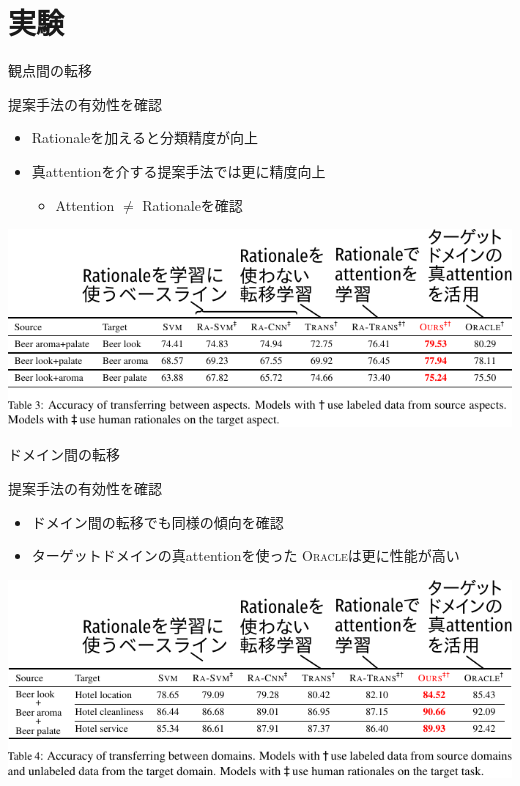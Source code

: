 \section{実験}
\frame[standout]{\insertsection}

\begin{frame}{観点間の転移}
\begin{lead}
    提案手法の有効性を確認
\end{lead}
\begin{itemize}
\item Rationaleを加えると分類精度が向上
\item 真attentionを介する提案手法では更に精度向上
\begin{itemize}
    \item Attention $\neq$ Rationaleを確認
\end{itemize}
\end{itemize}
\vspace*{-8pt}
\includegraphics{fig/table3.pdf}
\end{frame}

\begin{frame}{ドメイン間の転移}
\begin{lead}
    提案手法の有効性を確認
\end{lead}
\begin{itemize}
\item ドメイン間の転移でも同様の傾向を確認
\item ターゲットドメインの真attentionを使った \textsc{Oracle}は更に性能が高い
\end{itemize}
\vspace*{-8pt}
\includegraphics{fig/table4.pdf}
\end{frame}

